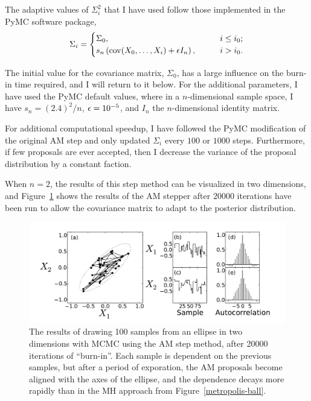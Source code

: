 The adaptive values of $\Sigma^2_i$ that I have used follow those
implemented in the PyMC software package,\cite{Patil_PyMC_2010}
\[
\Sigma_i = \begin{cases}
\Sigma_0, &\qquad i \leq i_0;\\
s_n \left(\operatorname{cov}(X_0, \ldots, X_i) + \epsilon I_n\right), &\qquad i > i_0.
\end{cases}
\]

The initial value for the covariance matrix, $\Sigma_0$, has a large
influence on the burn-in time required, and I will return to it below.
For the additional parameters, I have used the PyMC default values,
where in a $n$-dimensional sample space, I have $s_n = (2.4)^2/n$, $\epsilon
= 10^{-5}$, and $I_n$ the $n$-dimensional identity matrix.

For additional computational speedup, I have followed the PyMC
modification of the original AM step and only updated $\Sigma_i$ every
$100$ or $1000$ steps.  Furthermore, if few proposals are
ever accepted, then I decrease the variance of the
proposal distribution by a constant faction.

When $n=2$, the results of this step method can be visualized in two
dimensions, and Figure~\ref{am-ball} shows the results of the AM
stepper after $20000$ iterations have been run to allow the covariance
matrix to adapt to the posterior distribution.

\begin{figure}[ht]
\begin{center}
\includegraphics[width=\textwidth]{am-ball-2.pdf}
\caption{The results of drawing 100 samples from an ellipse in two
  dimensions with MCMC using the AM step method, after 20000
  iterations of ``burn-in''.  Each sample is dependent on the previous
  samples, but after a period of exporation, the AM proposals become
  aligned with the axes of the ellipse, and the dependence decays more
  rapidly than in the MH approach from Figure~\ref{metropolis-ball}.}
\label{am-ball}
\end{center}
\end{figure}

